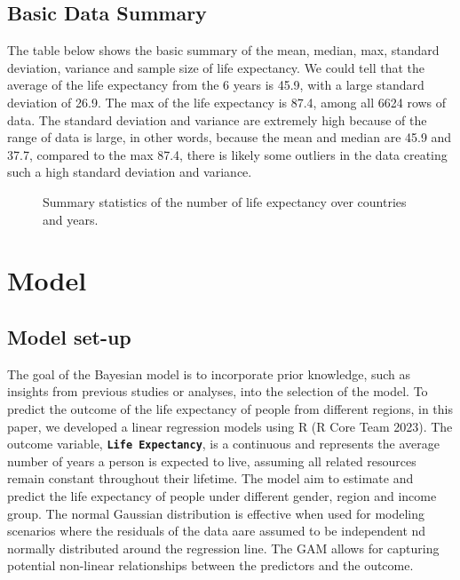 \documentclass[
  letterpaper,
  DIV=11,
  numbers=noendperiod]{scrartcl}
\begin{document}
\subsection{Basic Data Summary}\label{basic-data-summary}

The table below shows the basic summary of the mean, median, max,
standard deviation, variance and sample size of life expectancy. We
could tell that the average of the life expectancy from the 6 years is
45.9, with a large standard deviation of 26.9. The max of the life
expectancy is 87.4, among all 6624 rows of data. The standard deviation
and variance are extremely high because of the range of data is large,
in other words, because the mean and median are 45.9 and 37.7, compared
to the max 87.4, there is likely some outliers in the data creating such
a high standard deviation and variance.

\begin{figure}


\caption{\label{fig-summary}Summary statistics of the number of life
expectancy over countries and years.}

\end{figure}%

\section{Model}\label{model}

\subsection{Model set-up}\label{sec-modset}

The goal of the Bayesian model is to incorporate prior knowledge, such
as insights from previous studies or analyses, into the selection of the
model. To predict the outcome of the life expectancy of people from
different regions, in this paper, we developed a linear regression
models using R (R Core Team 2023). The outcome variable,
\textbf{\texttt{Life\ Expectancy}}, is a continuous and represents the
average number of years a person is expected to live, assuming all
related resources remain constant throughout their lifetime. The model
aim to estimate and predict the life expectancy of people under
different gender, region and income group. The normal Gaussian
distribution is effective when used for modeling scenarios where the
residuals of the data aare assumed to be independent nd normally
distributed around the regression line. The GAM allows for capturing
potential non-linear relationships between the predictors and the
outcome.
\end{document}
